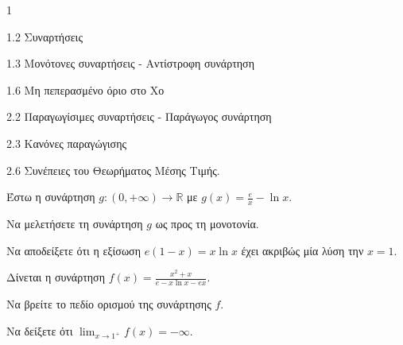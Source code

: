 \begin{ylh}{1}
    \item 1.2 Συναρτήσεις
    \item 1.3 Μονότονες συναρτήσεις - Αντίστροφη συνάρτηση
    \item 1.6 Μη πεπερασμένο όριο στο Χο
    \item 2.2 Παραγωγίσιμες συναρτήσεις - Παράγωγος συνάρτηση
    \item 2.3 Κανόνες παραγώγισης
    \item 2.6 Συνέπειες του Θεωρήματος Μέσης Τιμής.
\end{ylh}
Έστω η συνάρτηση $g:(0,+\infty) \to \mathbb{R}$ με $g(x)=\frac{e}{x}-\ln x$.
\begin{alist}
\item Να μελετήσετε τη συνάρτηση $g$ ως προς τη μονοτονία. 
\item Να αποδείξετε ότι η εξίσωση $e(1-x)=x\ln x$ έχει ακριβώς μία λύση την $x=1$. 
\item Δίνεται η συνάρτηση $f(x)=\frac{x^2+x}{e-x\ln x-ex}$.
\begin{rlist}
\item Να βρείτε το πεδίο ορισμού της συνάρτησης $f$. 
\item Να δείξετε ότι $\lim_{x \to 1^+} f(x)=-\infty$. 
\end{rlist}
\end{alist}